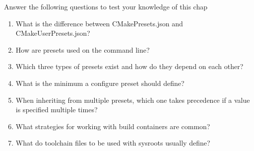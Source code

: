 Answer the following questions to test your knowledge of this chap

\begin{enumerate}
\item 
What is the difference between CMakePresets.json and CMakeUserPresets.json?

\item 
How are presets used on the command line?

\item 
Which three types of presets exist and how do they depend on each other?

\item 
What is the minimum a configure preset should define?

\item 
When inheriting from multiple presets, which one takes precedence if a value is specified multiple times?

\item 
What strategies for working with build containers are common?

\item 
What do toolchain files to be used with sysroots usually define?
\end{enumerate}